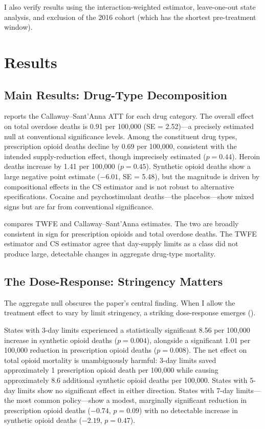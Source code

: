 \documentclass[12pt]{article}
\begin{document}
I also verify results using the \citet{sun2021estimating} interaction-weighted estimator, leave-one-out state analysis, and exclusion of the 2016 cohort (which has the shortest pre-treatment window).

\section{Results}

\subsection{Main Results: Drug-Type Decomposition}



 reports the Callaway--Sant'Anna ATT for each drug category. The overall effect on total overdose deaths is 0.91 per 100,000 (SE = 2.52)---a precisely estimated null at conventional significance levels. Among the constituent drug types, prescription opioid deaths decline by 0.69 per 100,000, consistent with the intended supply-reduction effect, though imprecisely estimated ($p = 0.44$). Heroin deaths increase by 1.41 per 100,000 ($p = 0.45$). Synthetic opioid deaths show a large negative point estimate ($-6.01$, SE = 5.48), but the magnitude is driven by compositional effects in the CS estimator and is not robust to alternative specifications. Cocaine and psychostimulant deaths---the placebos---show mixed signs but are far from conventional significance.



 compares TWFE and Callaway--Sant'Anna estimates. The two are broadly consistent in sign for prescription opioids and total overdose deaths. The TWFE estimator and CS estimator agree that day-supply limits as a class did not produce large, detectable changes in aggregate drug-type mortality.

\subsection{The Dose-Response: Stringency Matters}

The aggregate null obscures the paper's central finding. When I allow the treatment effect to vary by limit stringency, a striking dose-response emerges ().



States with 3-day limits experienced a statistically significant 8.56 per 100,000 increase in synthetic opioid deaths ($p = 0.004$), alongside a significant 1.01 per 100,000 reduction in prescription opioid deaths ($p = 0.008$). The net effect on total opioid mortality is unambiguously harmful: 3-day limits saved approximately 1 prescription opioid death per 100,000 while causing approximately 8.6 additional synthetic opioid deaths per 100,000. States with 5-day limits show no significant effect in either direction. States with 7-day limits---the most common policy---show a modest, marginally significant reduction in prescription opioid deaths ($-0.74$, $p = 0.09$) with no detectable increase in synthetic opioid deaths ($-2.19$, $p = 0.47$).
\end{document}
